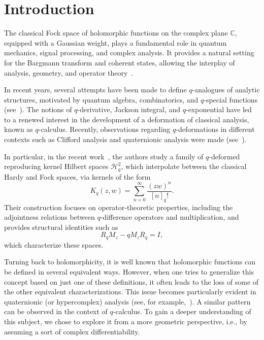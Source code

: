 \documentclass[10pt]{amsart}
\theoremstyle{plain}
\theoremstyle{definition}
\newcommand{\enm}[1]{\ensuremath{#1}}          %
\newcommand{\CC}{\enm{\mathbb{C}}}
\begin{document}
\maketitle
\setcounter{tocdepth}{1} %





\section{Introduction}
The classical Fock space of holomorphic functions on the complex plane $\CC$, equipped with a Gaussian weight, plays a fundamental role in quantum mechanics, signal processing, and complex analysis. It provides a natural setting for the Bargmann transform and coherent states, allowing the interplay of analysis, geometry, and operator theory~\cite{Barg1961}.

In recent years, several attempts have been made to define $q$-analogues of analytic structures, motivated by quantum algebra, combinatorics, and $q$-special functions (see~\cite{Ernst2012, Gasper2009, Kac2002}). The notions of $q$-derivative, Jackson integral, and $q$-exponential have led to a renewed interest in the development of a deformation of classical analysis, known as $q$-calculus. Recently, observations regarding $q$-deformations in different contexts such as Clifford analysis and quaternionic analysis were made (see~\cite{ACKS,BAZ,GonzCe,BeZiSchn2022}).

In particular, in the recent work~\cite{ACKS}, the authors study a family of $q$-deformed reproducing kernel Hilbert spaces $\mathcal{H}^2_q$, which interpolate between the classical Hardy and Fock spaces, via kernels of the form
\[
K_q(z, w) = \sum_{n=0}^\infty \frac{(z w)^n}{[n]_q!}.
\]
Their construction focuses on operator-theoretic properties, including the adjointness relations between $q$-difference operators and multiplication, and provides structural identities such as
\[
R_q M_z - q M_z R_q = I,
\]
which characterize these spaces.

Turning back to holomorphicity, it is well known that holomorphic functions can be defined in several equivalent ways. However, when one tries to generalize this concept based on just one of these definitions, it often leads to the loss of some of the other equivalent characterizations. This issue becomes particularly evident in quaternionic (or hypercomplex) analysis (see, for example,~\cite{Sudbery1979}). A similar pattern can be observed in the context of $q$-calculus. To gain a deeper understanding of this subject, we chose to explore it from a more geometric perspective, i.e., by assuming a sort of complex differentiability.
\end{document}
